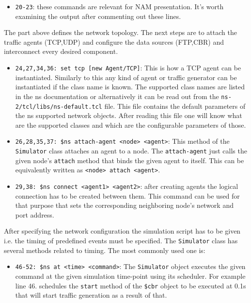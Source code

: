 \documentclass[a4paper]{article}
\begin{document}
\begin{itemize}
    \item \verb!20-23!: these commands are relevant for NAM presentation. It's worth examining the output
          after
          commenting out these lines.

\end{itemize}

The part above defines the network topology. The next steps are to attach the traffic agents (TCP,UDP) and configure
the data sources (FTP,CBR) and interconnect every desired component.

\begin{itemize}%

    \item \verb!24,27,34,36: set tcp [new Agent/TCP]!: This is how a TCP agent can be instantiated. Similarly to this any kind of agent or
          traffic generator can be instantiated if the class name is known. The supported class names are listed in the
          ns
          documentation or alternatively it can be read out from the \verb!ns-2/tcl/libs/ns-default.tcl! file. This file contains
          the default
          parameters of the ns supported network objects. After reading this file one will know what are the supported
          classes
          and which are the configurable parameters of those.

    \item \verb!26,28,35,37: $ns attach-agent <node> <agent>!: This method of the \verb!Simulator! class attaches an agent to a node. The
          \verb!attach-agent! just calls the given node's \verb!attach! method that binds the given agent
          to
          itself. This can be equivalently written as \verb!<node> attach <agent>!.

    \item \verb!29,38: $ns connect <agent1> <agent2>!: after creating agents the logical connection has to be created between them. This
          command can be used for that purpose that sets the corresponding neighboring node's network and port address.

\end{itemize}

After specifying the network configuration the simulation script has to be given i.e. the timing of predefined events
must be specified. The \verb!Simulator! class has several methods related to timing. The most commonly used one
is:

\begin{itemize}

    \item \verb!46-52: $ns at <time> <command>!: The \verb!Simulator! object executes the given command at the given
          simulation
          time-point  using its scheduler. For example line 46. schedules the \verb!start! method of the
          \verb!$cbr! object to be executed at 0.1s that will start traffic generation as a result of that.

\end{itemize}
\end{document}
